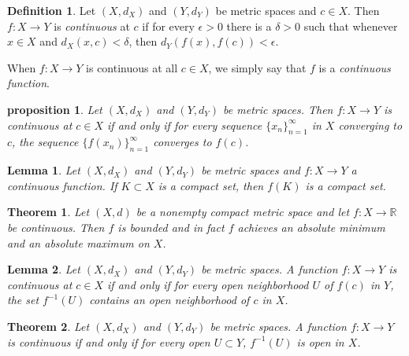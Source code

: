 \documentclass{article}
\newtheorem{theorem}{Theorem}[section]
\newtheorem{lemma}{Lemma}[section]
\newtheorem{proposition}{Proposition}[section]
\newtheorem{proposition}{proposition}[section]
\theoremstyle{definition}
\newtheorem{definition}{Definition}[section]
\theoremstyle{remark}
\begin{document}
\begin{definition} \label{def:continuous_function}
Let \( (X, d_X) \) and \( (Y, d_Y) \) be metric spaces and \( c \in X \). Then \( f: X \to Y \) is \textit{continuous} at \( c \) if for every \( \epsilon > 0 \) there is a \( \delta > 0 \) such that whenever \( x \in X \) and \( d_X(x, c) < \delta \), then \( d_Y(f(x), f(c)) < \epsilon \).

When \( f: X \to Y \) is continuous at all \( c \in X \), we simply say that \( f \) is a \textit{continuous function}.
\end{definition}

\begin{proposition} \label{prop:continuity_sequence}
Let \( (X, d_X) \) and \( (Y, d_Y) \) be metric spaces. Then \( f: X \to Y \) is continuous at \( c \in X \) if and only if for every sequence \( \{x_n\}_{n=1}^{\infty} \) in \( X \) converging to \( c \), the sequence \( \{f(x_n)\}_{n=1}^{\infty} \) converges to \( f(c) \).
\end{proposition}

\begin{lemma} \label{lem:continuous_compact}
Let \( (X, d_X) \) and \( (Y, d_Y) \) be metric spaces and \( f: X \to Y \) a continuous function. If \( K \subset X \) is a compact set, then \( f(K) \) is a compact set.
\end{lemma}

\begin{theorem} \label{thm:max_min_compact}
Let \( (X, d) \) be a nonempty compact metric space and let \( f: X \to \mathbb{R} \) be continuous. Then \( f \) is bounded and in fact \( f \) achieves an absolute minimum and an absolute maximum on \( X \).

\end{theorem}

\begin{lemma} \label{lem:continuity_neighborhood}
Let \( (X, d_X) \) and \( (Y, d_Y) \) be metric spaces. A function \( f: X \to Y \) is continuous at \( c \in X \) if and only if for every open neighborhood \( U \) of \( f(c) \) in \( Y \), the set \( f^{-1}(U) \) contains an open neighborhood of \( c \) in \( X \).
\end{lemma}

\begin{theorem} \label{thm:continuity_open_sets}
Let \( (X, d_X) \) and \( (Y, d_Y) \) be metric spaces. A function \( f: X \to Y \) is continuous if and only if for every open \( U \subset Y \), \( f^{-1}(U) \) is open in \( X \).
\end{theorem}
\end{document}
